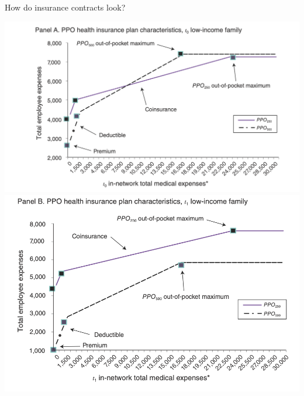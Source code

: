 \documentclass[xcolor=pdftex,dvipsnames,table,mathserif,aspectratio=169]{beamer}
\begin{document}
\begin{frame}{How do insurance contracts look?}
\begin{center}
\includegraphics[scale=.37]{resources/handel_f1a.png}
\includegraphics[scale=.37]{resources/handel_f1b.png}
\end{center}
\end{frame}
\end{document}
